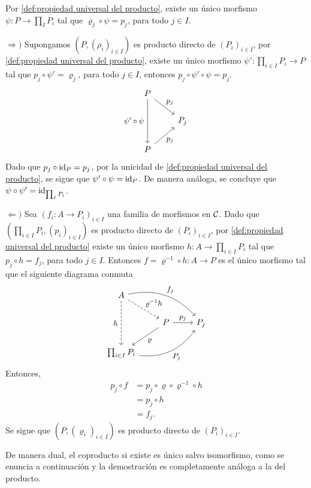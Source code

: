 \begin{dem}
    Por \ref{def:propiedad universal del producto}, existe un único morfismo $\psi:P\to  \prod_{I}P_i$ tal que  $\varrho_j\circ\psi=p_j$, para todo $j\in I.$ 
    
    $\Rightarrow)$ Supongamos $(P,(\rho_i)_{i\in I})$
    es producto directo de $(P_i)_{i\in I}$, por \ref{def:propiedad universal del producto}, existe un único morfismo $\psi':\prod_{i\in I}P_i\to P$ tal que  $p_j\circ\psi'=\varrho_j$, para todo $j\in I$, entonces $p_j\circ\psi'\circ\psi=p_j$.
      \[
\begin{tikzcd}[every label/.append style = {font = \small},column sep=normal, row sep=normal]
  P \arrow[dd,"\psi'\circ\psi"'{xshift=-1.75pt}]  \arrow[dr,"p_j"] \\
   & P_j  \\
  P  \arrow[ur,"p_j"']
\end{tikzcd}
\] 
Dado que $p_j\circ\mathrm{id}_P=p_j$, por la unicidad de \ref{def:propiedad universal del producto}, se sigue que $\psi'\circ\psi=\mathrm{id}_P$. De manera análoga, se concluye que $\psi\circ\psi'=\mathrm{id}_{\prod_{I}P_i}$. 

$\Leftarrow)$ Sea $(f_i:A\to P_i)_{i\in I}$ una familia de morfismos en $\mathcal{C}$. Dado que $(\prod_{i\in I}P_i,(p_i)_{i\in I})$ es producto directo de $(P_i)_{i\in I}$, por \ref{def:propiedad universal del producto} existe un único morfismo $h:A\to \prod_{i\in I}P_i$ tal que $p_j\circ h=f_j$, para todo $j\in I$. Entonces $f=\varrho^{-1}\circ h:A\to P$ es el único morfismo tal que el siguiente diagrama conmuta
 \[
\begin{tikzcd}[every label/.append style = {font = \small},column sep=normal, row sep=normal]
   A \arrow[dd, dashed, "h"'{xshift=-1.75pt}]  \arrow[drr, bend left, "f_j"]  \arrow[dr,dashed, "\varrho^{-1}h"] \\
   & P \arrow[r,"p_j"]  \arrow[dl,"\varrho"] & P_j  \\
   \prod_{i\in I}P_i  \arrow[urr, bend right, "P_j"']
\end{tikzcd}
\] 
Entonces,
\begin{align*}
    p_j\circ f&=p_j\circ\varrho\circ\varrho^{-1}\circ h\\
    &=p_j\circ h\\
    &=f_j.    
\end{align*}
Se sigue que $(P,(\varrho_i)_{i\in I})$ es producto directo de $(P_i)_{i\in I}$.
\end{dem}
    De manera dual, el coproducto si existe es único salvo isomorfismo, como se enuncia a continuación y la demostración es completamente análoga a la del producto.
